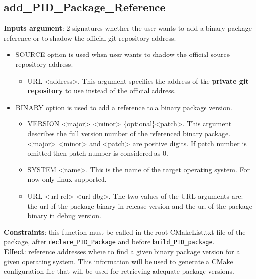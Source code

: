 \documentclass[12pt,a4paper]{article}
\begin{document}
\subsection{add\_PID\_Package\_Reference}
\label{sec:PIDCMakefunctionsAPI_add_reference}
\textbf{Inputs argument}:  2 signatures whether the user wants to add a binary package reference or to shadow the official git repository address.
\begin{itemize}
\item SOURCE option is used when user wants to shadow the official source repository address.
\begin{itemize}
\item URL <address>. This argument specifies the address of the \textbf{private git repository} to use instead of the official address.
\end{itemize}
\item BINARY option is used to add a reference to a binary package version.
\begin{itemize}
\item VERSION <major> <minor> \{optional\}<patch>. This argument describes the full version number of the referenced binary package. <major> <minor> and <patch> are positive digits. If patch number is omitted then patch number is considered as 0.
\item SYSTEM <name>. This is the name of the target operating system. For now only linux supported.
\item URL <url-rel> <url-dbg>. The two values of the URL arguments are: the url of the package binary in release version and the url of the package binary in debug version.
\end{itemize}
\end{itemize}

\textbf{Constraints}: this function must be called in the root CMakeList.txt file of the package, after \texttt{declare\_PID\_Package} and before \texttt{build\_PID\_package}.\\
\textbf{Effect}: reference addresses where to find a given binary package version for a given operating system. This information will be used to generate a CMake configuration file that will be used for retrieving adequate package versions.
\end{document}
